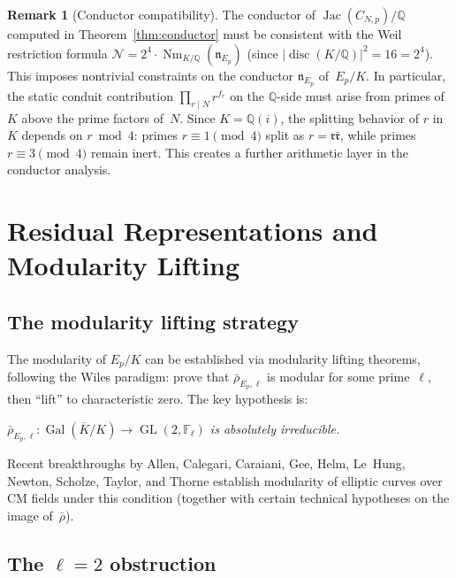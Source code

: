 \documentclass[11pt,a4paper]{article}
\theoremstyle{definition}
\newtheorem{remark}[theorem]{Remark}
\DeclareMathOperator{\Gal}{Gal}
\DeclareMathOperator{\GL}{GL}
\DeclareMathOperator{\Jac}{Jac}
\DeclareMathOperator{\Nm}{Nm}
\DeclareMathOperator{\disc}{disc}
\begin{document}
\begin{remark}[Conductor compatibility]\label{rem:conductor_compat}
The conductor of $\Jac(C_{N,p})/\mathbb{Q}$ computed in Theorem~\ref{thm:conductor} must be consistent with the Weil restriction formula $\mathcal{N} = 2^4 \cdot \Nm_{K/\mathbb{Q}}(\mathfrak{n}_{E_p})$ (since $|\disc(K/\mathbb{Q})|^2 = 16 = 2^4$). This imposes nontrivial constraints on the conductor $\mathfrak{n}_{E_p}$ of~$E_p/K$. In particular, the static conduit contribution $\prod_{r \mid N} r^{f_r}$ on the $\mathbb{Q}$-side must arise from primes of~$K$ above the prime factors of~$N$. Since $K = \mathbb{Q}(i)$, the splitting behavior of $r$ in~$K$ depends on $r \bmod 4$: primes $r \equiv 1 \pmod{4}$ split as $r = \mathfrak{r}\bar{\mathfrak{r}}$, while primes $r \equiv 3 \pmod{4}$ remain inert. This creates a further arithmetic layer in the conductor analysis.
\end{remark}

\section{Residual Representations and Modularity Lifting}\label{sec:residual}

\subsection{The modularity lifting strategy}

The modularity of $E_p/K$ can be established via modularity lifting theorems, following the Wiles paradigm: prove that $\bar{\rho}_{E_p,\ell}$ is modular for some prime~$\ell$, then ``lift'' to characteristic zero. The key hypothesis is:

\begin{center}
\emph{$\bar{\rho}_{E_p,\ell} : \Gal(\overline{K}/K) \to \GL(2, \mathbb{F}_\ell)$ is absolutely irreducible.}
\end{center}

Recent breakthroughs by Allen, Calegari, Caraiani, Gee, Helm, Le~Hung, Newton, Scholze, Taylor, and Thorne \cite{TenAuthor} establish modularity of elliptic curves over CM fields under this condition (together with certain technical hypotheses on the image of~$\bar{\rho}$).

\subsection{The $\ell = 2$ obstruction}
\end{document}
